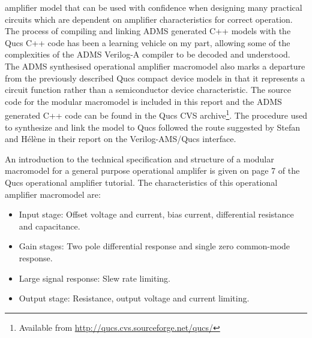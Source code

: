 amplifier model that can be used with confidence when designing many
practical circuits which are dependent on amplifier characteristics
for correct operation. The process of compiling and linking ADMS
generated C++ models with the Qucs C++ code has been a learning
vehicle on my part, allowing some of the complexities of the ADMS
Verilog-A compiler to be decoded and understood.  The ADMS synthesised
operational amplifier macromodel also marks a departure from the
previously described Qucs compact device models in that it represents
a circuit function rather than a semiconductor device characteristic.
The source code for the modular macromodel is included in this report
and the ADMS generated C++ code can be found in the Qucs CVS
archive\footnote{Available from
\url{http://qucs.cvs.sourceforge.net/qucs/}}. The procedure used to
synthesize and link the model to Qucs followed the route suggested by
Stefan and H\'{e}l\`{e}ne in their report on the Verilog-AMS/Qucs
interface.



An introduction to the technical specification and structure of a
modular macromodel for a general purpose operational amplifer is given
on page 7 of the Qucs operational amplifier tutorial. The
characteristics of this operational amplifier macromodel are:

\begin{itemize}
 \item Input stage: Offset voltage and current, bias current, differential resistance and capacitance.
 \item Gain stages: Two pole differential response and single zero common-mode response.
 \item Large signal response: Slew rate limiting.
 \item Output stage: Resistance, output voltage and current limiting.
\end{itemize}


